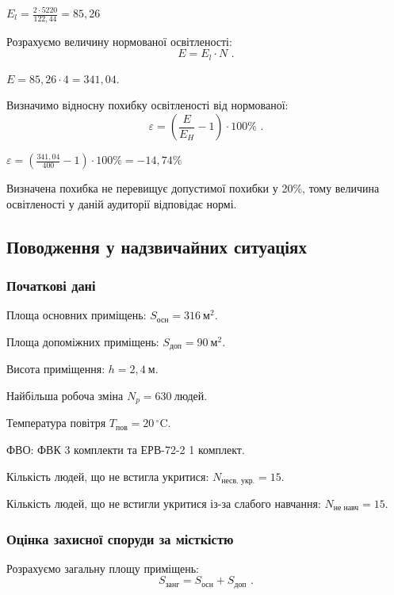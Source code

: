 \documentclass[a4paper,ukrainian,utf8,nocolumnsxix,floatsection,equationsection]{eskdtext}
\renewcommand\paragraph{\subsubsection}
\begin{document}
$E_l = \frac{2 \cdot 5220}{122,44} = 85,26$


Розрахуємо величину нормованої освітленості: 
\begin{equation}
	E = E_l \cdot N \text{ .}
\end{equation}

$E = 85,26 \cdot 4 = 341,04$.

Визначимо відносну похибку освітленості від нормованої:
\begin{equation}
	\varepsilon = \left( \frac{E}{E_H} - 1 \right) \cdot 100\% \text{ .}
\end{equation}

$\varepsilon = \left( \frac{341,04}{400} -1 \right) \cdot 100\% = -14,74\%$


Визначена похибка не перевищує допустимої похибки у 20\%, тому величина освітленості у даній аудиторії відповідає нормі.

\subsection{Поводження у надзвичайних ситуаціях}

\paragraph{Початкові дані}

Площа основних приміщень: $S_{\text{осн}} = 316\:\text{м}^2$.

Площа допоміжних приміщень: $S_{\text{доп}} = 90\:\text{м}^2$.

Висота приміщення: $h = 2,4\:\text{м}$.

Найбільша робоча зміна $N_p = 630\:\text{людей}$.

Температура повітря $T_{\text{пов}} = 20\,^{\circ}\mathrm{C}$.

ФВО: ФВК 3 комплекти та ЕРВ-72-2 1 комплект.

Кількість людей, що не встигла укритися: $N_{\text{несв. укр.}} = 15$.

Кількість людей, що не встигли укритися із-за слабого навчання: $N_{\text{не навч}} = 15$.

\paragraph{Оцінка захисної споруди за місткістю}

Розрахуємо загальну площу приміщень:
\begin{equation}
	S_{\text{занг}} = S_{\text{осн}} + S_{\text{доп}} \text{ .}
\end{equation}
\end{document}
